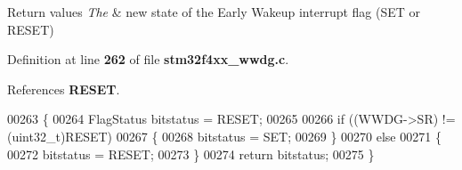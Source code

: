 \begin{DoxyRetVals}{Return values}
{\em The} & new state of the Early Wakeup interrupt flag (S\+ET or R\+E\+S\+ET) \\
\hline
\end{DoxyRetVals}


Definition at line \textbf{ 262} of file \textbf{ stm32f4xx\+\_\+wwdg.\+c}.



References \textbf{ R\+E\+S\+ET}.


\begin{DoxyCode}
00263 \{
00264   FlagStatus bitstatus = RESET;
00265     
00266   \textcolor{keywordflow}{if} ((WWDG->SR) != (uint32\_t)RESET)
00267   \{
00268     bitstatus = SET;
00269   \}
00270   \textcolor{keywordflow}{else}
00271   \{
00272     bitstatus = RESET;
00273   \}
00274   \textcolor{keywordflow}{return} bitstatus;
00275 \}
\end{DoxyCode}
